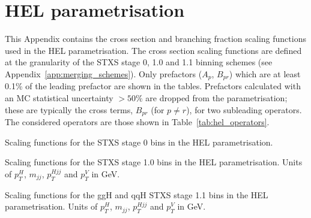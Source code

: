 \chapter{HEL parametrisation}\label{app:hel_parametrisation}

This Appendix contains the cross section and branching fraction scaling functions used in the HEL parametrisation. The cross section scaling functions are defined at the granularity of the STXS stage 0, 1.0 and 1.1 binning schemes (see Appendix~\ref{app:merging_schemes}). Only prefactors ($A_p$, $B_{pr}$) which are at least 0.1\% of the leading prefactor are shown in the tables. Prefactors calculated with an MC statistical uncertainty $>50\%$ are dropped from the parametrisation; these are typically the cross terms, $B_{pr}$ (for $p \neq r$), for two subleading operators. The considered operators are those shown in Table~\ref{tab:hel_operators}.

\begin{table}[htb!]
  \centering
  \scriptsize
  \renewcommand{\arraystretch}{4}
  \setlength{\tabcolsep}{6pt}
  \caption[HEL: Scaling functions for the STXS stage 0 bins]
  {
    Scaling functions for the STXS stage 0 bins in the HEL parametrisation.
  }
  \label{tab:hel_parametrisation_stage0}
  \hspace*{-2cm}
  
  \hspace*{-2cm}
\end{table}

\begin{table}[htb!]
  \centering
  \scriptsize
  \renewcommand{\arraystretch}{1.8}
  \setlength{\tabcolsep}{6pt}
  \caption[HEL: Scaling functions for the STXS stage 1 bins]
  {
    Scaling functions for the STXS stage 1.0 bins in the HEL parametrisation. Units of $p_T^H$, $m_{jj}$, $p_T^{Hjj}$ and $p_T^V$ in GeV.
  }
  \label{tab:hel_parametrisation_stage1}
  \hspace*{-2cm}
  
  \hspace*{-2cm}
\end{table}

\begin{table}[htb!]
  \centering
  \scriptsize
  \renewcommand{\arraystretch}{1.8}
  \setlength{\tabcolsep}{6pt}
  \caption[HEL: Scaling functions for the ggH and qqH STXS stage 1.1 bins]
  {
    Scaling functions for the ggH and qqH STXS stage 1.1 bins in the HEL parametrisation. Units of $p_T^H$, $m_{jj}$, $p_T^{Hjj}$ and $p_T^V$ in GeV.
  }
  \label{tab:hel_parametrisation_stage1p1_a}
  \hspace*{-2cm}
  
  \hspace*{-2cm}
\end{table}

